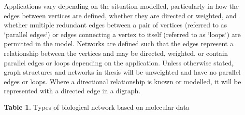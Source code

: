 Applications vary depending on the situation modelled, particularly in how the edges between vertices are defined, whether they are directed or weighted, and whether multiple redundant edges between a pair of vertices (referred to as `parallel edges`) or edges connecting a vertex to itself (referred to as `loops`) are permitted in the model. Networks are defined such that the edges represent a relationship between the vertices and may be directed, weighted, or contain parallel edges or loops depending on the application. Unless otherwise stated, graph structures and networks in thesis will be unweighted and have no parallel edges or loops. Where a directional relationship is known or modelled, it will be represented with a directed edge in a digraph.

\iffalse

\textbf{Table 1. }Types of biological network based on molecular data
